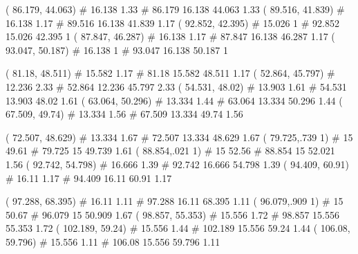 \documentclass[a4paper,openbib,10pt]{article}
\newenvironment{treegraph}{\begin{graph}}{\end{graph}}
\begin{document}
\begin{treegraph}
  ( 86.179, 44.063) #     16.138    1.33
   #    86.179    16.138    44.063    1.33
  ( 89.516, 41.839) #     16.138    1.17
   #    89.516    16.138    41.839    1.17
  ( 92.852, 42.395) #     15.026    1
   #    92.852    15.026    42.395    1
  ( 87.847, 46.287) #     16.138    1.17
   #    87.847    16.138    46.287    1.17
  ( 93.047, 50.187) #     16.138    1
   #    93.047    16.138    50.187    1

  ( 81.18, 48.511) #     15.582    1.17
   #    81.18    15.582    48.511    1.17
  ( 52.864, 45.797) #     12.236    2.33
   #    52.864    12.236    45.797    2.33
  ( 54.531, 48.02) #     13.903    1.61
   #    54.531    13.903    48.02    1.61
  ( 63.064, 50.296) #     13.334    1.44
   #    63.064    13.334    50.296    1.44
  ( 67.509, 49.74) #     13.334    1.56
   #    67.509    13.334    49.74    1.56

  ( 72.507, 48.629) #     13.334    1.67
   #    72.507    13.334    48.629    1.67
  ( 79.725,.739    1) #     15    49.61
   #    79.725    15    49.739    1.61
  ( 88.854,.021    1) #     15    52.56
   #    88.854    15    52.021    1.56
  ( 92.742, 54.798) #     16.666    1.39
   #    92.742    16.666    54.798    1.39
  ( 94.409, 60.91) #     16.11    1.17
   #    94.409    16.11    60.91    1.17

  ( 97.288, 68.395) #     16.11    1.11
   #    97.288    16.11    68.395    1.11
  ( 96.079,.909    1) #     15    50.67
   #    96.079    15    50.909    1.67
  ( 98.857, 55.353) #     15.556    1.72
   #    98.857    15.556    55.353    1.72
  ( 102.189, 59.24) #     15.556    1.44
   #    102.189    15.556    59.24    1.44
  ( 106.08, 59.796) #     15.556    1.11
   #    106.08    15.556    59.796    1.11


\end{treegraph}
\end{document}
